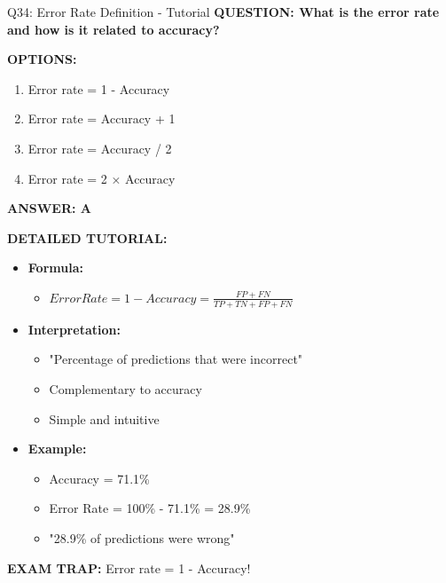 \documentclass[8pt]{beamer}
\begin{document}
	\begin{frame}{Q34: Error Rate Definition - Tutorial}
		\fontsize{6.5}{7.5}\selectfont
		\textbf{QUESTION: What is the error rate and how is it related to accuracy?}
		
		\vspace{0.1cm}
		\textbf{OPTIONS:}
		\begin{enumerate}
			\item Error rate = 1 - Accuracy
			\item Error rate = Accuracy + 1
			\item Error rate = Accuracy / 2
			\item Error rate = 2 × Accuracy
		\end{enumerate}
		
		\vspace{0.1cm}
		\textcolor{myblue}{\textbf{ANSWER: A}}
		
		\vspace{0.1cm}
		\textbf{DETAILED TUTORIAL:}
		\begin{itemize}
			\item \textbf{Formula:}
			\begin{itemize}
				\item $Error Rate = 1 - Accuracy = \frac{FP + FN}{TP + TN + FP + FN}$
			\end{itemize}
			\item \textbf{Interpretation:}
			\begin{itemize}
				\item "Percentage of predictions that were incorrect"
				\item Complementary to accuracy
				\item Simple and intuitive
			\end{itemize}
			\item \textbf{Example:}
			\begin{itemize}
				\item Accuracy = 71.1\%
				\item Error Rate = 100\% - 71.1\% = 28.9\%
				\item "28.9\% of predictions were wrong"
			\end{itemize}
		\end{itemize}
		
		\textcolor{myred}{\textbf{EXAM TRAP:}} Error rate = \textcolor{myblue}{1 - Accuracy}!
	\end{frame}
	
\end{document}
